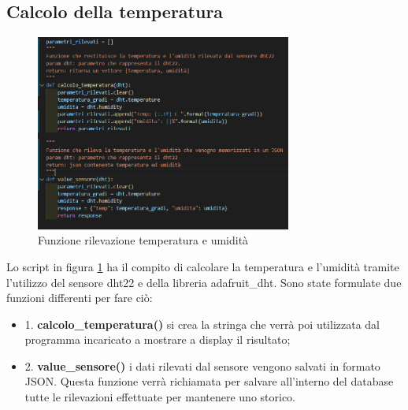 \documentclass[a4paper,11pt]{report}
\begin{document}
\subsection{Calcolo della temperatura}
\begin{figure}[H]
	\centering
	\includegraphics[width=0.75\textwidth]{temperatura_rasp}
	\caption{Funzione rilevazione temperatura e umidità}
	\label{temp}
\end{figure}
Lo script in figura \ref{temp} ha il compito di calcolare la temperatura e l’umidità tramite l’utilizzo del sensore dht22 e della libreria adafruit\_dht.
Sono state formulate due funzioni differenti per fare ciò:
\begin{itemize}
	\item 1. \textbf{calcolo\_temperatura()} si crea la stringa che verrà poi utilizzata dal programma incaricato a mostrare a display il risultato;
	\item 2. \textbf{value\_sensore()} i dati rilevati dal sensore vengono salvati in formato JSON. Questa funzione verrà richiamata per salvare all’interno del database tutte le rilevazioni effettuate per mantenere uno storico.
\end{itemize}
\end{document}
